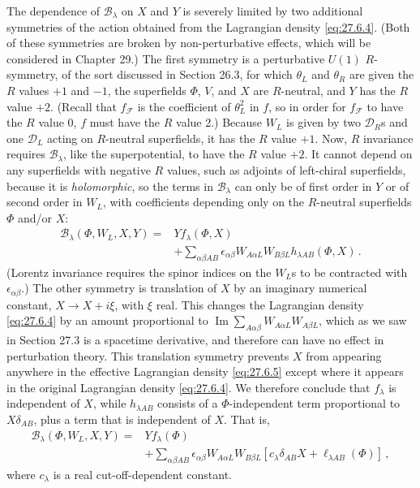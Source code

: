 The dependence of \(\mathcal{B}_\lambda\) on \(X\) and \(Y\) is severely
limited by two additional symmetries of the action obtained from the
Lagrangian density \eqref{eq:27.6.4}. (Both of these symmetries are broken by
non-perturbative effects, which will be considered in Chapter 29.) The first
symmetry is a perturbative \(U(1)\) \(R\)-symmetry, of the sort discussed in
Section 26.3, for which \(\theta_L\) and \(\theta_R\) are given the \(R\)
values \(+1\) and \(-1\), the superfields \(\Phi\), \(V\), and \(X\) are
\(R\)-neutral, and \(Y\) has the \(R\) value \(+2\). (Recall that
\(f_{\mathcal{F}}\) is the coefficient of \(\theta_L^2\) in \(f\), so in
order for \(f_{\mathcal{F}}\) to have the \(R\) value 0, \(f\) must have
the \(R\) value 2.) Because \(W_L\) is given by two \(\mathcal{D}_R\)s and
one \(\mathcal{D}_L\) acting on \(R\)-neutral superfields, it has the \(R\)
value \(+1\). Now, \(R\) invariance requires \(\mathcal{B}_\lambda\), like
the superpotential, to have the \(R\) value \(+2\). It cannot depend on any
superfields with negative \(R\) values, such as adjoints of left-chiral
superfields, because it is \emph{holomorphic}, so the terms in
\(\mathcal{B}_\lambda\) can only be of first order in \(Y\) or of second
order in \(W_L\), with coefficients depending only on the \(R\)-neutral
superfields \(\Phi\) and/or \(X\):
\begin{equation}
  \begin{aligned}
  \mathcal{B}_\lambda(\Phi,W_L,X,Y)
  ={}&
  Yf_\lambda(\Phi,X)
  \\
  &+\sum_{\alpha\beta AB}
  \epsilon_{\alpha\beta}W_{A\alpha L}W_{B\beta L}
  h_{\lambda AB}(\Phi,X)\,.
  \end{aligned}
  \tag{27.6.6}\label{eq:27.6.6}
\end{equation}
(Lorentz invariance requires the spinor indices on the \(W_L\)s to be
contracted with \(\epsilon_{\alpha\beta}\).) The other symmetry is
translation of \(X\) by an imaginary numerical constant,
\(X\longrightarrow X+i\xi\), with \(\xi\) real. This changes the Lagrangian
density \eqref{eq:27.6.4} by an amount proportional to
\(\operatorname{Im}\sum_{A\alpha\beta}W_{A\alpha L}W_{A\beta L}\), which as
we saw in Section 27.3 is a spacetime derivative, and therefore can have no
effect in perturbation theory. This translation symmetry prevents \(X\)
from appearing anywhere in the effective Lagrangian density
\eqref{eq:27.6.5} except where it appears in the original Lagrangian density
\eqref{eq:27.6.4}. We therefore conclude that \(f_\lambda\) is independent
of \(X\), while \(h_{\lambda AB}\) consists of a \(\Phi\)-independent term
proportional to \(X\delta_{AB}\), plus a term that is independent of \(X\).
That is,
\begin{equation}
  \begin{aligned}
  \mathcal{B}_\lambda(\Phi,W_L,X,Y)
  ={}&
  Yf_\lambda(\Phi)
  \\
  &+\sum_{\alpha\beta AB}
  \epsilon_{\alpha\beta}W_{A\alpha L}W_{B\beta L}
  \left[
    c_\lambda\delta_{AB}X+\ell_{\lambda AB}(\Phi)
  \right]\,,
  \end{aligned}
  \tag{27.6.7}\label{eq:27.6.7}
\end{equation}
where \(c_\lambda\) is a real cut-off-dependent constant.

